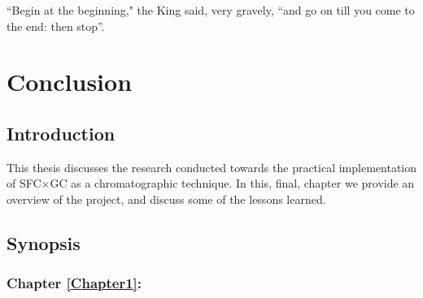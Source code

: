 
\begin{savequote}[\quotewidth]
``Begin at the beginning," the King said, very gravely, ``and go on till you come to the end: then stop''.
\end{savequote}

\chapter{Conclusion} %

\label{Chapter8} %

\section{Introduction}


This thesis discusses the research conducted towards the practical
implementation of SFC×GC as a chromatographic technique. In this, final, chapter
we provide an overview of the project, and discuss some of the lessons learned.

\section{Synopsis}

\subsection{Chapter \ref{Chapter1}:  }

